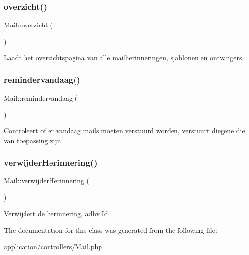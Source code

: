 \subsubsection{\texorpdfstring{overzicht()}{overzicht()}}
{\footnotesize\ttfamily Mail\+::overzicht (\begin{DoxyParamCaption}{ }\end{DoxyParamCaption})}

Laadt het overzichtspagina van alle mailherinneringen, sjablonen en ontvangers. \mbox{\label{class_mail_a6b0bf7c864a3999c5b56222deb88874f}} 
\subsubsection{\texorpdfstring{remindervandaag()}{remindervandaag()}}
{\footnotesize\ttfamily Mail\+::remindervandaag (\begin{DoxyParamCaption}{ }\end{DoxyParamCaption})}

Controleert of er vandaag mails moeten verstuurd worden, verstuurt diegene die van toepassing zijn \mbox{\label{class_mail_a5870a82a870b3b579d503101494abaf9}} 
\subsubsection{\texorpdfstring{verwijder\+Herinnering()}{verwijderHerinnering()}}
{\footnotesize\ttfamily Mail\+::verwijder\+Herinnering (\begin{DoxyParamCaption}{ }\end{DoxyParamCaption})}

Verwijdert de herinnering, adhv Id 

The documentation for this class was generated from the following file\+:\begin{DoxyCompactItemize}
\item 
application/controllers/Mail.\+php\end{DoxyCompactItemize}

